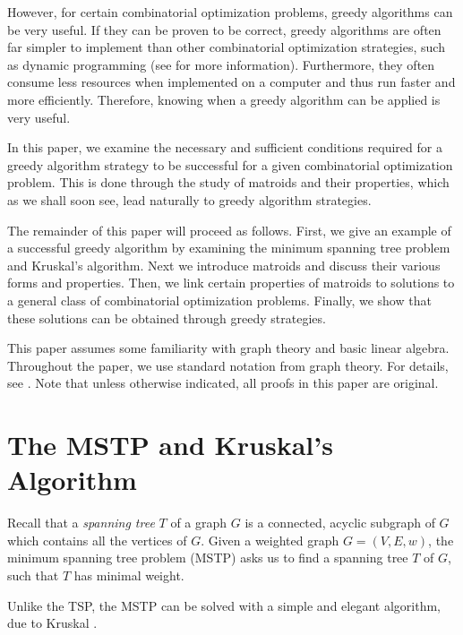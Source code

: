 \documentclass[a4paper,11pt]{report}
\theoremstyle{plain}
\theoremstyle{definition}
\begin{document}

However, for certain combinatorial optimization problems, greedy algorithms can
be very useful. If they can be proven to be correct, greedy algorithms are
often far simpler to implement than other combinatorial optimization
strategies, such as dynamic programming (see \cite[pp. 378--387]{clrs} for more
information). Furthermore, they often consume less resources when implemented
on a computer and thus run faster and more efficiently. Therefore, knowing when
a greedy algorithm can be applied is very useful.

In this paper, we examine the necessary and sufficient conditions required for
a greedy algorithm strategy to be successful for a given combinatorial
optimization problem. This is done through the study of matroids and their
properties, which as we shall soon see, lead naturally to greedy algorithm
strategies.

The remainder of this paper will proceed as follows. First, we give an example
of a successful greedy algorithm by examining the minimum spanning tree
problem and Kruskal's algorithm. Next we introduce matroids and discuss their
various forms and properties. Then, we link certain properties of matroids to
solutions to a general class of combinatorial optimization problems. Finally,
we show that these solutions can be obtained through greedy strategies.

This paper assumes some familiarity with graph theory and basic linear
algebra. Throughout the paper, we use standard notation from graph theory.
For details, see \cite[pp. 1--6]{matroid-theory}. Note that unless otherwise
indicated, all proofs in this paper are original.


\section{The MSTP and Kruskal's Algorithm}

Recall that a \emph{spanning tree} $T$ of a graph $G$ is a connected, acyclic
subgraph of $G$ which contains all the vertices of $G$. Given a weighted graph
$G = (V,E,w)$, the minimum spanning tree problem (MSTP) asks us to find a
spanning tree $T$ of $G$, such that $T$ has minimal weight.

Unlike the TSP, the MSTP can be solved with a simple and elegant algorithm, due
to Kruskal \cite[pp. 631--633]{clrs}.

\end{document}

